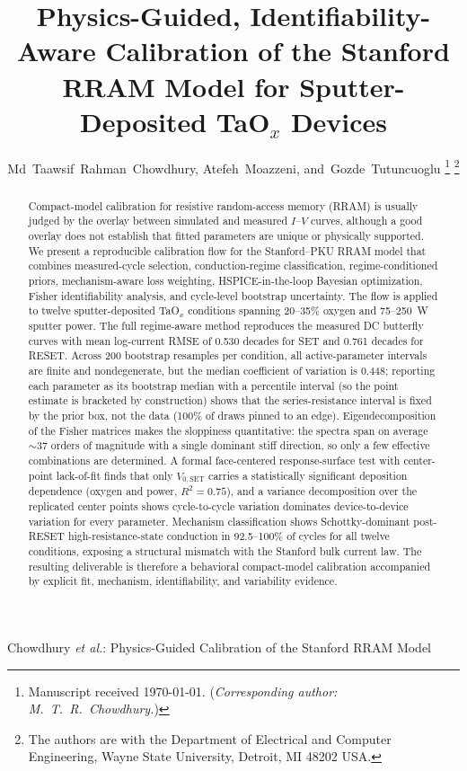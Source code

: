 \documentclass[journal]{IEEEtran}
\begin{document}
\title{Physics-Guided, Identifiability-Aware Calibration of the Stanford
RRAM Model for Sputter-Deposited TaO$_x$ Devices}

\author{Md~Taawsif~Rahman~Chowdhury,
        Atefeh~Moazzeni,
        and~Gozde~Tutuncuoglu%
\thanks{Manuscript received \today. (\emph{Corresponding author:
M.~T.~R.~Chowdhury.})}%
\thanks{The authors are with the Department of Electrical and Computer
Engineering, Wayne State University, Detroit, MI 48202 USA.}}

%
{Chowdhury \MakeLowercase{\textit{et al.}}: Physics-Guided Calibration of the Stanford RRAM Model}

\maketitle

\begin{abstract}
Compact-model calibration for resistive random-access memory (RRAM) is
usually judged by the overlay between simulated and measured $I$--$V$
curves, although a good overlay does not establish that fitted parameters are
unique or physically supported.  We present a reproducible calibration flow
for the Stanford--PKU RRAM model that combines measured-cycle selection,
conduction-regime classification, regime-conditioned priors,
mechanism-aware loss weighting, HSPICE-in-the-loop Bayesian optimization,
Fisher identifiability analysis, and cycle-level bootstrap uncertainty.  The
flow is applied to twelve sputter-deposited TaO$_x$ conditions spanning
20--35\% oxygen and 75--250~W sputter power.  The full regime-aware method
reproduces the measured DC butterfly curves with mean log-current RMSE of
0.530 decades for SET and 0.761 decades for RESET.  Across 200 bootstrap
resamples per condition, all active-parameter intervals are finite and
nondegenerate, but the median coefficient of variation is 0.448; reporting
each parameter as its bootstrap median with a percentile interval (so the point
estimate is bracketed by construction) shows that the series-resistance
interval is fixed by the prior box, not the data (100\% of draws pinned to an
edge).  Eigendecomposition of the Fisher matrices makes the sloppiness
quantitative: the spectra span on average $\sim$37 orders of magnitude with a
single dominant stiff direction, so only a few effective combinations are
determined.  A formal face-centered response-surface test with center-point
lack-of-fit finds that only $V_{0,\mathrm{SET}}$ carries a statistically
significant deposition dependence (oxygen and power, $R^2=0.75$), and a
variance decomposition over the replicated center points shows cycle-to-cycle
variation dominates device-to-device variation for every parameter.  Mechanism
classification shows Schottky-dominant post-RESET high-resistance-state
conduction in 92.5--100\% of cycles for all twelve conditions, exposing a
structural mismatch with the Stanford bulk current law.  The resulting
deliverable is therefore a behavioral compact-model calibration accompanied by
explicit fit, mechanism, identifiability, and variability evidence.
\end{abstract}
\end{document}
